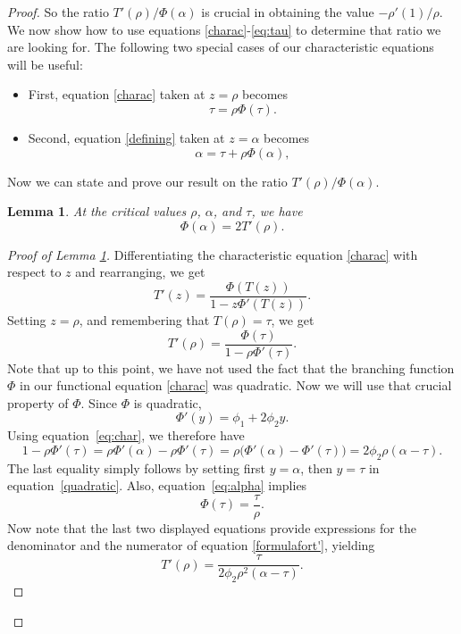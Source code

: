 \documentclass[11pt, onesided]{amsart}
\newtheorem{lemma}[theorem]{Lemma}
\theoremstyle{remark}
\begin{document}
\begin{proof}
So the ratio $T'(\rho)/\Phi(\alpha)$ is crucial in obtaining the value $-\rho'(1)/\rho$.  We now show how to use equations \eqref{charac}-\eqref{eq:tau} to determine that ratio we are looking for.  The following two special cases of our characteristic equations will be useful:
\begin{itemize}
\item
First, equation \eqref{charac} taken at $z=\rho$ becomes
\begin{equation}
\label{eq:alpha}
	\tau=\rho\Phi(\tau).
\end{equation}
\item
Second, equation \eqref{defining} taken at $z=\alpha$ becomes
\begin{equation}
\label{eq:tau}
	\alpha=\tau+\rho\Phi(\alpha),
\end{equation}
\end{itemize}
Now we can state and prove our result on the ratio $T'(\rho)/\Phi(\alpha)$.

\begin{lemma}\label{lem:phiandt}
At the critical values \(\rho\), \(\alpha\), and \(\tau\), we have
\begin{equation} \label{phiandt}
\Phi(\alpha)=2T'(\rho).
\end{equation}
\end{lemma}

\begin{proof}[Proof of Lemma \ref{lem:phiandt}]
Differentiating the characteristic equation \eqref{charac}
with respect to $z$ and rearranging, we get
\[
T'(z)=
\frac{\Phi(T(z))}
{1-z\Phi'(T(z))}.
\]
Setting $z=\rho$, and remembering that $T(\rho)=\tau$, we get
\begin{equation} \label{formulafort'}
T'(\rho)=
\frac{\Phi(\tau)}
{1-\rho\Phi'(\tau)}.
\end{equation}
Note that up to this point, we have not used the fact that the branching function $\Phi$  in our functional equation \eqref{charac} was quadratic. Now we will use that crucial property of $\Phi$.
Since \(\Phi\) is quadratic,
\begin{equation} \label{quadratic}
\Phi'(y)=\phi_1+2\phi_2y.
\end{equation}
Using equation~\eqref{eq:char}, we therefore have
\[
1-\rho\Phi'(\tau)
=\rho\Phi'(\alpha) - \rho \Phi'(\tau)=
\rho\bigl(\Phi'(\alpha)-\Phi'(\tau)\bigr)
=
2\phi_2\rho(\alpha-\tau).
\] The last equality simply follows by setting first $y=\alpha$, then $y=\tau$ in equation~\eqref{quadratic}.
Also, equation~\eqref{eq:alpha} implies
\[
\Phi(\tau)=\frac{\tau}{\rho}.
\]
Now note that the last two displayed equations provide expressions for the denominator and the numerator of equation \eqref{formulafort'},
yielding
\begin{equation}
T'(\rho)
=
\frac{\tau}
{2\phi_2\rho^2(\alpha-\tau)}.
\label{eq:Tprime}
\end{equation}


\end{proof}
\end{proof}
\end{document}
